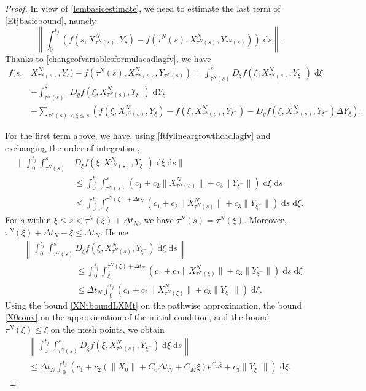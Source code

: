 \documentclass[reqno,12pt]{amsart}
\theoremstyle{plain} %
\theoremstyle{definition} %
\begin{document}
\begin{proof}
    In view of \cref{lembasicestimate}, we need to estimate the last term of \eqref{Etjbasicbound}, namely
    \[
        \left\|\int_0^{t_j} \left( f(s, X_{\tau^N(s)}^N, Y_s) - f(\tau^N(s), X_{\tau^N(s)}^N, Y_{\tau^N(s)}) \right)\;\mathrm{d}s\right\|.
    \]
    Thanks to \eqref{changeofvariablesformulacadlagfv}, we have
    \begin{align*}
        f(s, & X_{\tau^N(s)}^N, Y_s) - f(\tau^N(s), X_{\tau^N(s)}^N, Y_{\tau^N(s)}) = \int_{\tau^N(s)}^s D_\xi f(\xi, X_{\tau^N(s)}^N, Y_{\xi^-})\;\mathrm{d}\xi \\
        & + \int_{\tau^N(s)^+}^s D_y f(\xi, X_{\tau^N(s)}^N, Y_{\xi^-}) \;\mathrm{d}Y_\xi \\
        & + \sum_{\tau^N(s) < \xi \leq s} \left(f(\xi, X_{\tau^N(s)}^N, Y_\xi) - f(\xi, X_{\tau^N(s)}^N, Y_{\xi^{-}}) - D_y f(\xi, X_{\tau^N(s)}^N, Y_{\xi^-})\Delta Y_\xi\right).
    \end{align*}
    
    For the first term above, we have, using \eqref{ftfylineargrowthcadlagfv} and exchanging the order of integration,
    \begin{align*}
        \bigg\|\int_0^{t_j} \int_{\tau^N(s)}^s & D_\xi f(\xi, X_{\tau^N(s)}^N, Y_{\xi^-}) \;\mathrm{d}\xi\;\mathrm{d}s\bigg\| \\
        & \leq \int_0^{t_j} \int_{\tau^N(s)}^s \left(c_1 + c_2 \|X_{\tau^N(s)}^N\| + c_3\|Y_{\xi^-}\|\right)\;\mathrm{d}\xi\;\mathrm{d}s \\
        & \leq \int_0^{t_j} \int_{\xi}^{\tau^N(\xi) + \Delta t_N} \left(c_1 + c_2 \|X_{\tau^N(s)}^N\| + c_3\|Y_{\xi^-}\|\right)\;\mathrm{d}s\;\mathrm{d}\xi.
    \end{align*}
    For $s$ within $\xi \leq s < \tau^N(\xi) + \Delta t_N$, we have $\tau^N(s) = \tau^N(\xi)$. Moreover, $\tau^N(\xi) + \Delta t_N- \xi \leq \Delta t_N$. Hence
    \begin{align*}
        & \left\|\int_0^{t_j} \int_{\tau^N(s)}^s D_\xi f(\xi, X_{\tau^N(s)}^N, Y_{\xi^-})\;\mathrm{d}\xi\;\mathrm{d}s\right\| \\
        & \qquad \qquad \qquad \leq \int_0^{t_j} \int_{\xi}^{\tau^N(\xi) + \Delta t_N} \left(c_1 + c_2 \|X_{\tau^N(\xi)}^N\| + c_3\|Y_{\xi^-}\|\right)\;\mathrm{d}s\;\mathrm{d}\xi \\
        & \qquad \qquad \qquad \leq \Delta t_N\int_0^{t_j} \left(c_1 + c_2 \|X_{\tau^N(\xi)}^N\| + c_3\|Y_{\xi^-}\|\right)\;\mathrm{d}\xi.
    \end{align*}
    Using the bound \eqref{XNtboundLXMt} on the pathwise approximation, the bound \eqref{X0conv} on the approximation of the initial condition, and the bound $\tau^N(\xi)\leq \xi$ on the mesh points, we obtain
    \begin{multline*}
        \left\|\int_0^{t_j} \int_{\tau^N(s)}^s D_\xi f(\xi, X_{\tau^N(s)}^N, Y_{\xi^-})\;\mathrm{d}\xi\;\mathrm{d}s\right\| \\
        \leq \Delta t_N\int_0^{t_j} \left(c_1 + c_2 \left(\|X_0\| + C_0\Delta t_N + C_M \xi \right)e^{C_L \xi} + c_3\|Y_{\xi^-}\|\right)\;\mathrm{d}\xi.
    \end{multline*}


\end{proof}
\end{document}
